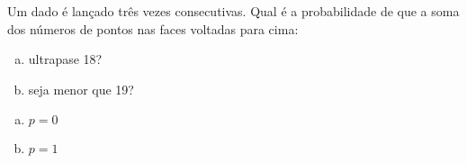 \begin{ex}
Um dado é lançado três vezes consecutivas. Qual é a probabilidade de que a soma dos números de pontos nas faces voltadas para cima:
   \begin{enumerate}[(a)]
   \item ultrapase 18?
   \item seja menor que 19?
   \end{enumerate}
     \begin{sol}
      \phantom{A}
      \begin{enumerate} [(a)]
          \item $p=0$
          \item $p=1$
      \end{enumerate}
     \end{sol}
\end{ex}